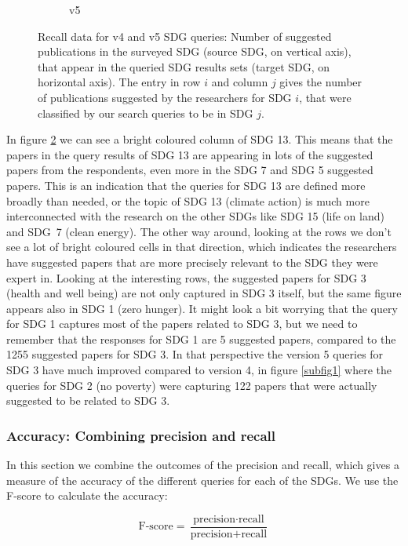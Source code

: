 \documentclass{article}
\begin{document}
\begin{figure}[H]
\begin{subfigure}{0.49\textwidth}
            \caption{v5}
            \label{subfig2}
        \end{subfigure}
        \caption{Recall data for v4 and v5 SDG queries:  Number of suggested publications in the surveyed SDG (source SDG, on vertical axis), that appear in the queried SDG results sets (target SDG, on horizontal axis). The entry in row $i$ and column $j$ gives the number of publications suggested by the researchers for SDG $i$, that were classified by our search queries to be in SDG $j$.}
\end{figure}

In figure \ref{subfig2} we can see a bright coloured column of SDG 13. This means that the papers in the query results of SDG 13 are appearing in lots of the suggested papers from the respondents, even more in the SDG 7 and SDG 5 suggested papers. This is an indication that the queries for SDG 13 are defined more broadly than needed, or the topic of SDG 13 (climate action) is much more interconnected with the research on the other SDGs like SDG 15 (life on land) and SDG~7 (clean energy). The other way around, looking at the rows we don't see a lot of bright coloured cells in that direction, which indicates the researchers have suggested papers that are more precisely relevant to the SDG they were expert in. Looking at the interesting rows, the suggested papers for SDG 3 (health and well being) are not only captured in SDG 3 itself, but the same figure appears also in SDG 1 (zero hunger). It might look a bit worrying that the query for SDG 1 captures most of the papers related to SDG 3, but we need to remember that the responses for SDG 1 are 5 suggested papers, compared to the 1255 suggested papers for SDG 3. In that perspective the version 5 queries for SDG 3 have much improved compared to version 4, in figure \ref{subfig1} where the queries for SDG 2 (no poverty) were capturing 122 papers that were actually suggested to be related to SDG 3.


\subsubsection{Accuracy: Combining precision and recall}
In this section we combine the outcomes of the precision and recall, which gives a measure of the accuracy of the different queries for each of the SDGs. We use the F-score to calculate the accuracy:

\begin{equation*}
    \text{F-score} = \frac{\text{precision}\cdot\text{recall}}{\text{precision}+\text{recall}}
\end{equation*}
\end{document}
